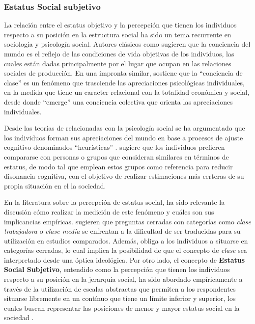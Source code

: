 \documentclass[12pt]{article}
\begin{document}
\subsubsection{Estatus Social subjetivo}

La relación entre el estatus objetivo y la percepción que tienen los individuos respecto a su posición en la estructura social ha sido un tema recurrente en sociología y psicología social. Autores clásicos como \cite{marx1979} sugieren que la conciencia del mundo es el reflejo de las condiciones de vida objetivas de los individuos, las cuales están dadas principalmente por el lugar que ocupan en las relaciones sociales de producción. En una impronta similar, \cite{lukacs1969} sostiene que la ``conciencia de clase'' es un fenómeno que trasciende las apreciaciones psicológicas individuales, en la medida que tiene un caracter relacional con la totalidad económica y social, desde donde ``emerge'' una conciencia colectiva que orienta las apreciaciones individuales. 

Desde las teorías de relacionadas con la psicología social se ha argumentado que los individuos forman sus apreciaciones del mundo en base a procesos de ajuste cognitivo denominados ``heurísticas'' \citep{Evans1992, Evans2017}. \cite{festinger1954theory} sugiere que los individuos prefieren compararse con personas o grupos que consideran similares en términos de estatus, de modo tal que emplean estos grupos como referencia para reducir disonancia cognitiva, con el objetivo de realizar estimaciones más certeras de su propia situación en el la sociedad.

En la literatura sobre la percepción de estatus social, ha sido relevante la discusión cómo realizar la medición de este fenómeno y cuáles son sus implicancias empíricas. \citet{Evans2004} sugieren que preguntas cerradas con categorías como \textit{clase trabajadora} o \textit{clase media} se enfrentan a la dificultad de ser traducidas para su utilización en estudios comparados. Además, obliga a los individuos a situarse en categorías cerradas, lo cual implica la posibilidad de que el concepto de \emph{clase} sea interpretado desde una óptica ideológica. Por otro lado, el concepto de \textbf{Estatus Social Subjetivo}, entendido como la percepción que tienen los individuos respecto a su posición en la jerarquía social, ha sido abordado empíricamente a través de la utilización de escalas abstractas que permiten a los respondentes situarse libremente en un contínuo que tiene un límite inferior y superior, los cuales buscan representar las posiciones de menor y mayor estatus social en la sociedad \citep{Castillo2013, Evans2004, Lindemann2014}.     
\end{document}
